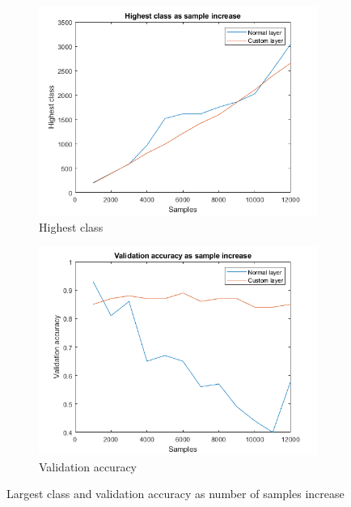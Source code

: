 \begin{figure}
    \centering
    \begin{subfigure}[b]{.45\textwidth}
        \centering
        \includegraphics[width=\textwidth]{figures/firstmax.png}
        \caption{Highest class}
        \label{sfig:ex:extra:firstmax}
    \end{subfigure}
    \hfill
    \begin{subfigure}[b]{.45\textwidth}
        \centering
        \includegraphics[width=\textwidth]{figures/firstres.png}
        \caption{Validation accuracy}
        \label{sfig:ex:extra:firstres}
    \end{subfigure}
    \caption{Largest class and validation accuracy as number of samples increase}
    \label{fig:ex:extra:firstresult}
\end{figure}

